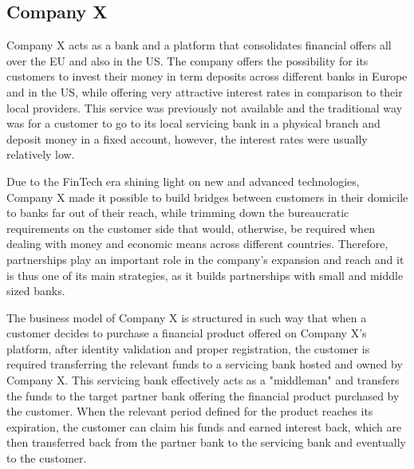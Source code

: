 \documentclass[11pt,a4paper]{article}
\begin{document}
{{\subsection{Company X}
\vspace{-1mm}
 \par Company X acts as a bank and a platform that consolidates financial offers all over the EU and also in the US. The company offers the possibility for its customers to invest their money in term deposits across different banks in Europe and in the US, while offering very attractive interest rates in comparison to their local providers. This service was previously not available and the traditional way was for a customer to go to its local servicing bank in a physical branch and deposit money in a fixed account, however, the interest rates were usually relatively low. \par 
Due to the FinTech era shining light on new and advanced technologies, Company X made it possible to build bridges between customers in their domicile to banks far out of their reach, while trimming down the bureaucratic requirements on the customer side that would, otherwise, be required when dealing with money and economic means across different countries. Therefore, partnerships play an important role in the company's expansion and reach and it is thus one of its main strategies, as it builds partnerships with small and middle sized banks.  \par
The business model of Company X is structured in such way that when a customer decides to purchase a financial product offered on Company X's platform, after identity validation and proper registration, the customer is required transferring the relevant funds to a servicing bank hosted and owned by Company X. This servicing bank effectively acts as a "middleman" and transfers the funds to the target partner bank offering the financial product purchased by the customer. When the relevant period defined for the product reaches its expiration, the customer can claim his funds and earned interest back, which are then transferred back from the partner bank to the servicing bank and eventually to the customer. \par 
}}
\end{document}
